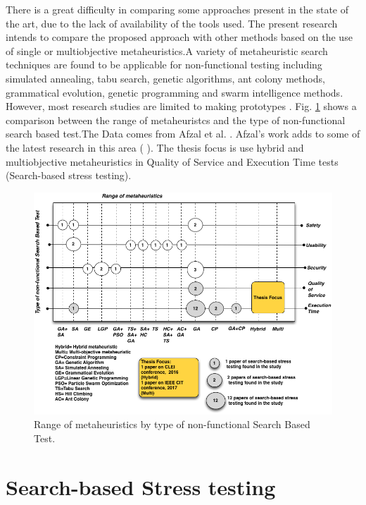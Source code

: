 \documentclass[espaco=umemeio,chapter=TITLE,twoside,openright]{abnt}
\begin{document}
There is a great difficulty in
comparing some approaches present in the state of
the art, due to the lack of availability of the tools used. The present research intends to compare the proposed approach with other methods based on the use of single or multiobjective metaheuristics.A variety of metaheuristic search techniques are found to be applicable for non-functional testing including simulated annealing, tabu search, genetic algorithms, ant colony methods, grammatical evolution, genetic programming and swarm intelligence methods. However, most research studies are limited to making prototypes \cite{Afzal2009a}.  Fig. \ref{fig:metabykind} shows a comparison between the range of metaheuristcs and the type of non-functional search based test.The Data comes from Afzal et al. \cite{Afzal2009a}. Afzal's work adds to some of the latest research in this area (\cite{Garousi2006} \cite{Garousi2010} \cite{DiAlesio2013} \cite{DiAlesio2014} \cite{Alesio2015} \cite{Gois2016}). The thesis focus is use  hybrid and multiobjective metaheuristics in Quality of Service and Execution Time tests (Search-based stress testing).


\begin{figure}[h]
\centering
\includegraphics[width=1\textwidth]{./images/metaheuristics.png}
\caption{Range of metaheuristics by type of non-functional Search Based Test\cite{Afzal2009a}. }
\label{fig:metabykind}
\end{figure}


\section{Search-based Stress testing}
\end{document}
